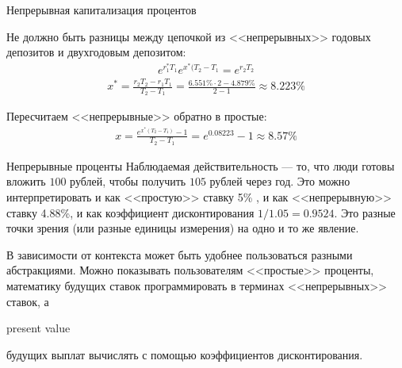 \documentclass{beamer}
\newcommand{\en}[1]{\begin{otherlanguage}{english}#1\end{otherlanguage}}
\begin{document}
\begin{frame}{Непрерывная капитализация процентов}
\centering
{}

\justifying
Не должно быть разницы между цепочкой из <<непрерывных>> годовых депозитов и двухгодовым депозитом:
\begin{align*}
e^{r_1^*T_1}e^{x^*(T_2-T_1} = e^{r_2T_2}
\end{align*}
\begin{align*}
x^* = \frac{r_2T_2-r_1T_1}{T_2-T_1} = \frac{6.551\%\cdot2 - 4.879\%}{2 - 1} \approx 8.223\%
\end{align*}

Пересчитаем <<непрерывные>> обратно в простые:
\begin{align*}
x = \frac{e^{x^*(T_2-T_1)} - 1}{T_2 - T_1} = e^{0.08223} - 1 \approx 8.57\% 
\end{align*}
\end{frame}



\begin{frame}{Непрерывные проценты}
\justify
Наблюдаемая действительность --- то, что люди готовы вложить $100$ рублей, чтобы получить $105$ рублей через год. Это можно интерпретировать и как <<простую>> ставку 5\% , и как <<непрерывную>> ставку 4.88\%, и как коэффициент дисконтирования $1/1.05 = 0.9524$. Это разные точки зрения (или разные единицы измерения) на одно и то же явление.

\justify 
В зависимости от контекста может быть удобнее пользоваться разными абстракциями. Можно показывать пользователям <<простые>> проценты, математику будущих ставок программировать в терминах <<непрерывных>> ставок, а \en{present value} будущих выплат вычислять с помощью коэффициентов дисконтирования.
\end{frame}
\end{document}
